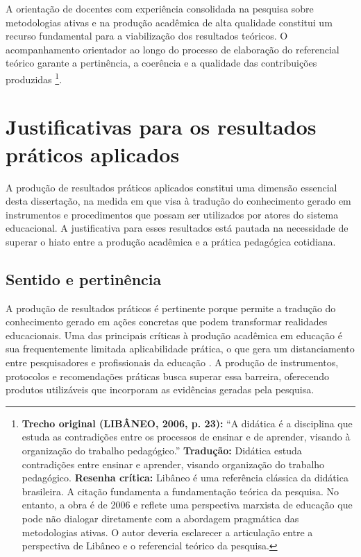 A orientação de docentes com experiência consolidada na pesquisa sobre metodologias ativas e na produção acadêmica de alta qualidade constitui um recurso fundamental para a viabilização dos resultados teóricos. O acompanhamento orientador ao longo do processo de elaboração do referencial teórico garante a pertinência, a coerência e a qualidade das contribuições produzidas \cite{LIBANEO2006}\footnote{\textbf{Trecho original (LIBÂNEO, 2006, p. 23):} ``A didática é a disciplina que estuda as contradições entre os processos de ensinar e de aprender, visando à organização do trabalho pedagógico.'' \textbf{Tradução:} Didática estuda contradições entre ensinar e aprender, visando organização do trabalho pedagógico. \textbf{Resenha crítica:} Libâneo é uma referência clássica da didática brasileira. A citação fundamenta a fundamentação teórica da pesquisa. No entanto, a obra é de 2006 e reflete uma perspectiva marxista de educação que pode não dialogar diretamente com a abordagem pragmática das metodologias ativas. O autor deveria esclarecer a articulação entre a perspectiva de Libâneo e o referencial teórico da pesquisa.}.

\section{Justificativas para os resultados práticos aplicados}
\label{sec:justificativa_praticos}

A produção de resultados práticos aplicados constitui uma dimensão essencial desta dissertação, na medida em que visa à tradução do conhecimento gerado em instrumentos e procedimentos que possam ser utilizados por atores do sistema educacional. A justificativa para esses resultados está pautada na necessidade de superar o hiato entre a produção acadêmica e a prática pedagógica cotidiana.

\subsection{Sentido e pertinência}
\label{subsec:jpr_sentido}

A produção de resultados práticos é pertinente porque permite a tradução do conhecimento gerado em ações concretas que podem transformar realidades educacionais. Uma das principais críticas à produção acadêmica em educação é sua frequentemente limitada aplicabilidade prática, o que gera um distanciamento entre pesquisadores e profissionais da educação \cite{OLIVEIRA2023}. A produção de instrumentos, protocolos e recomendações práticas busca superar essa barreira, oferecendo produtos utilizáveis que incorporam as evidências geradas pela pesquisa.

